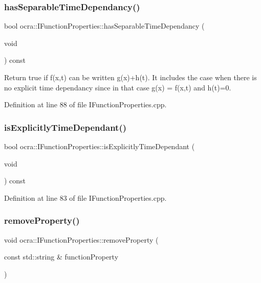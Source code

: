 \subsubsection{\texorpdfstring{has\+Separable\+Time\+Dependancy()}{hasSeparableTimeDependancy()}}
{\footnotesize\ttfamily bool ocra\+::\+I\+Function\+Properties\+::has\+Separable\+Time\+Dependancy (\begin{DoxyParamCaption}\item[{void}]{ }\end{DoxyParamCaption}) const}

Return true if f(x,t) can be written g(x)+h(t). It includes the case when there is no explicit time dependancy since in that case g(x) = f(x,t) and h(t)=0. 

Definition at line 88 of file I\+Function\+Properties.\+cpp.

\hypertarget{classocra_1_1IFunctionProperties_a02751762b878ab2ccefb36f2bec696e5}{}\label{classocra_1_1IFunctionProperties_a02751762b878ab2ccefb36f2bec696e5} 
\subsubsection{\texorpdfstring{is\+Explicitly\+Time\+Dependant()}{isExplicitlyTimeDependant()}}
{\footnotesize\ttfamily bool ocra\+::\+I\+Function\+Properties\+::is\+Explicitly\+Time\+Dependant (\begin{DoxyParamCaption}\item[{void}]{ }\end{DoxyParamCaption}) const}



Definition at line 83 of file I\+Function\+Properties.\+cpp.

\hypertarget{classocra_1_1IFunctionProperties_a87bba6ce19795439ea768f148fb47391}{}\label{classocra_1_1IFunctionProperties_a87bba6ce19795439ea768f148fb47391} 
\subsubsection{\texorpdfstring{remove\+Property()}{removeProperty()}}
{\footnotesize\ttfamily void ocra\+::\+I\+Function\+Properties\+::remove\+Property (\begin{DoxyParamCaption}\item[{const std\+::string \&}]{function\+Property }\end{DoxyParamCaption})\hspace{0.3cm}{\ttfamily [protected]}}

